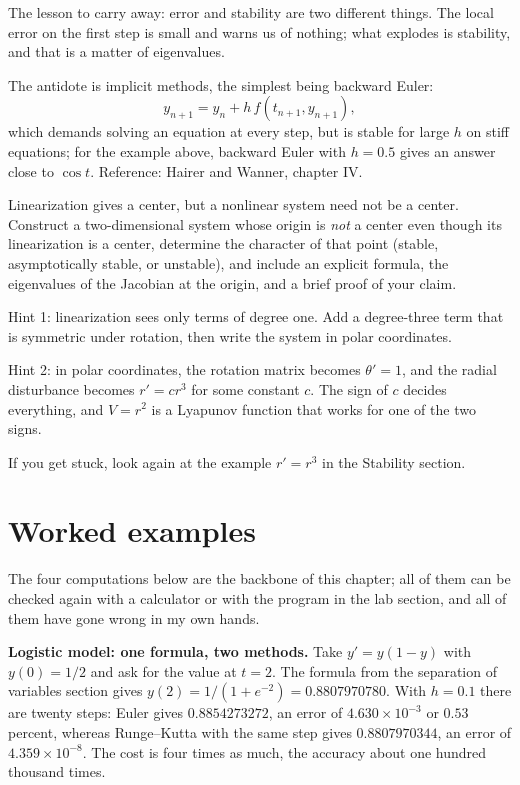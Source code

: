 The lesson to carry away: error and stability are two different things. The local error on
the first step is small and warns us of nothing; what explodes is
stability, and that is a matter of eigenvalues.

The antidote is implicit methods, the simplest being backward Euler:
\[
y_{n+1}=y_{n}+h\,f(t_{n+1},y_{n+1}),
\]
which demands solving an equation at every step, but is stable for large $h$
on stiff equations; for the example above, backward Euler with $h=0.5$
gives an answer close to $\cos t$. Reference: Hairer and Wanner, chapter IV.

\begin{tantangan}
Linearization gives a center, but a nonlinear system need not be a center. Construct a
two-dimensional system whose origin is \emph{not} a center even though its linearization is a
center, determine the character of that point (stable, asymptotically stable, or unstable),
and include an explicit formula, the eigenvalues of the Jacobian at the origin, and a brief
proof of your claim.

Hint 1: linearization sees only terms of degree one. Add a degree-three term that is
symmetric under rotation, then write the system in polar coordinates.

Hint 2: in polar coordinates, the rotation matrix becomes $\theta'=1$, and the radial
disturbance becomes $r'=cr^{3}$ for some constant $c$. The sign of $c$
decides everything, and $V=r^{2}$ is a Lyapunov function that works for
one of the two signs.

If you get stuck, look again at the example $r'=r^{3}$ in the Stability section.
\end{tantangan}
\section{Worked examples}

The four computations below are the backbone of this chapter; all of them can be checked
again with a calculator or with the program in the lab section, and all of them have gone
wrong in my own hands.

\textbf{Logistic model: one formula, two methods.}
Take $y'=y(1-y)$ with $y(0)=1/2$ and ask for the value at $t=2$. The formula from
the separation of variables section gives $y(2)=1/(1+e^{-2})=0.8807970780$. With
$h=0.1$ there are twenty steps: Euler gives $0.8854273272$, an error of
$4.630\times10^{-3}$ or $0.53$ percent, whereas Runge--Kutta with the same step
gives $0.8807970344$, an error of $4.359\times10^{-8}$. The cost is four times
as much, the accuracy about one hundred thousand times.

